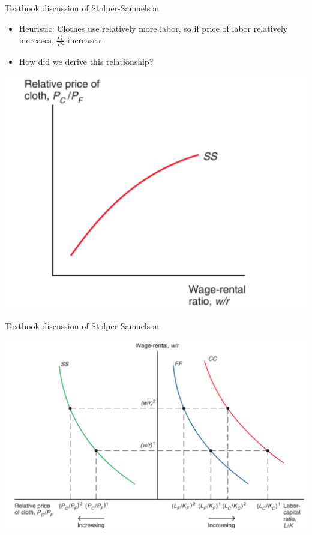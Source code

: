 \documentclass[ignorenonframetext,]{beamer}
\begin{document}
\begin{frame}{Textbook discussion of Stolper-Samuelson}

    \begin{itemize}
        \item Heuristic: Clothes use relatively more labor, so if price of labor relatively increases, $\frac{P_C}{P_F}$ increases.
        \item How did we derive this relationship?
    \end{itemize}
    \includegraphics[scale=0.2]{rel_price_input_price.png}

\end{frame}

\begin{frame}{Textbook discussion of Stolper-Samuelson}

    \includegraphics[scale=0.2]{sidebyside.png}

\end{frame}
\end{document}
